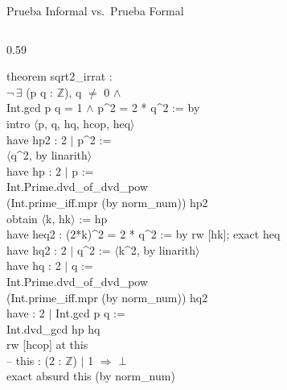 \documentclass[aspectratio=169, 10pt]{beamer}
\begin{document}
\begin{frame}{Prueba Informal vs.\ Prueba Formal}
\begin{columns}[T]
\begin{column}{0.59\textwidth}
      \colorbox{cpBlue!5}{\parbox{\linewidth}{%
        \ttfamily\scriptsize\color{leanpurple}
        theorem sqrt2\_irrat :\\[1pt]
        \hspace*{0.4em}$\neg\,\exists$ (p q : $\mathbb{Z}$), q $\neq$ 0 $\wedge$\\[1pt]
        \hspace*{1.0em}Int.gcd p q = 1 $\wedge$ p\^{}2 = 2 * q\^{}2 := by\\[1pt]
        \hspace*{0.4em}intro $\langle$p, q, hq, hcop, heq$\rangle$\\[1pt]
        \hspace*{0.4em}have hp2 : 2 $\mid$ p\^{}2 :=\\[1pt]
        \hspace*{1.8em}$\langle$q\^{}2, by linarith$\rangle$\\[1pt]
        \hspace*{0.4em}have hp : 2 $\mid$ p :=\\[1pt]
        \hspace*{1.8em}Int.Prime.dvd\_of\_dvd\_pow\\[1pt]
        \hspace*{2.4em}(Int.prime\_iff.mpr (by norm\_num)) hp2\\[1pt]
        \hspace*{0.4em}obtain $\langle$k, hk$\rangle$ := hp\\[1pt]
        \hspace*{0.4em}have heq2 : (2*k)\^{}2 = 2 * q\^{}2 := by rw [\textleftarrow hk]; exact heq\\[1pt]
        \hspace*{0.4em}have hq2 : 2 $\mid$ q\^{}2 := $\langle$k\^{}2, by linarith$\rangle$\\[1pt]
        \hspace*{0.4em}have hq : 2 $\mid$ q :=\\[1pt]
        \hspace*{1.8em}Int.Prime.dvd\_of\_dvd\_pow\\[1pt]
        \hspace*{2.4em}(Int.prime\_iff.mpr (by norm\_num)) hq2\\[1pt]
        \hspace*{0.4em}have : 2 $\mid$ Int.gcd p q :=\\[1pt]
        \hspace*{1.8em}Int.dvd\_gcd hp hq\\[1pt]
        \hspace*{0.4em}rw [hcop] at this\\[1pt]
        \hspace*{0.4em}\textcolor{cpGray}{-- this : (2 : $\mathbb{Z}$) $\mid$ 1 $\Rightarrow$ $\bot$}\\[1pt]
        \hspace*{0.4em}exact absurd this (by norm\_num)
      }}
    \end{column}
  \end{columns}
\end{frame}
\end{document}
